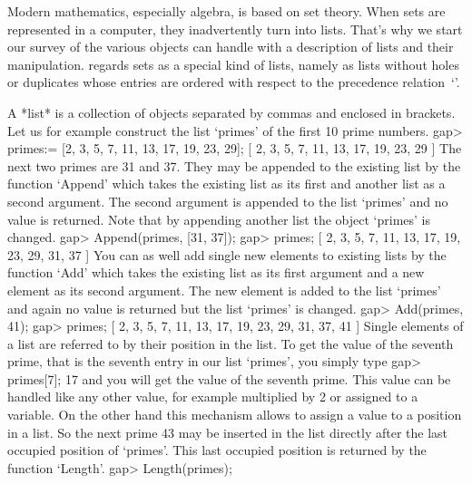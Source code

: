 
Modern mathematics, especially algebra, is based on set theory. When sets
are represented in a computer, they inadvertently turn into lists. That's
why we start our  survey of the various  objects {\GAP} can handle with a
description of  lists  and their  manipulation. {\GAP}  regards sets as a
special kind of lists, namely as lists without  holes or duplicates whose
entries are ordered with respect to the precedence relation~`\<'.


A *list* is a collection of objects separated by  commas and enclosed  in
brackets.  Let us for example construct the list `primes' of the first 10
prime numbers.
\beginexample
    gap> primes:= [2, 3, 5, 7, 11, 13, 17, 19, 23, 29];
    [ 2, 3, 5, 7, 11, 13, 17, 19, 23, 29 ]
\endexample
The next two primes are  31 and 37.  They may be appended to the existing
list by the function `Append' which takes  the existing list as its first
and another list as a second argument.  The  second argument  is appended
to the list `primes' and  no  value is returned.  Note that  by appending
another list the object `primes' is changed.
\beginexample
    gap> Append(primes, [31, 37]);
    gap> primes;
    [ 2, 3, 5, 7, 11, 13, 17, 19, 23, 29, 31, 37 ] 
\endexample
You can as well add single new elements to existing lists by the function
`Add'  which takes  the existing list  as its  first argument  and  a new
element as  its second argument.  The  new  element  is added to the list
`primes' and again no value is returned but the list `primes' is changed.
\beginexample
    gap> Add(primes, 41);
    gap> primes;
    [ 2, 3, 5, 7, 11, 13, 17, 19, 23, 29, 31, 37, 41 ] 
\endexample
Single elements of a list are referred to by their position in the  list.
To get the value  of the seventh prime, that is the seventh entry in  our
list `primes', you simply type
\beginexample
    gap> primes[7];
    17 
\endexample
and you  will get the  value  of the  seventh prime.  This  value  can be
handled like any other value, for example multiplied by 2 or  assigned to
a variable.  On the other hand this mechanism allows to assign a value to
a  position in  a list.  So the next prime 43 may be inserted in the list
directly  after  the  last  occupied  position  of `primes'.   This  last
occupied position is returned by the function `Length'.
\beginexample
    gap> Length(primes);
